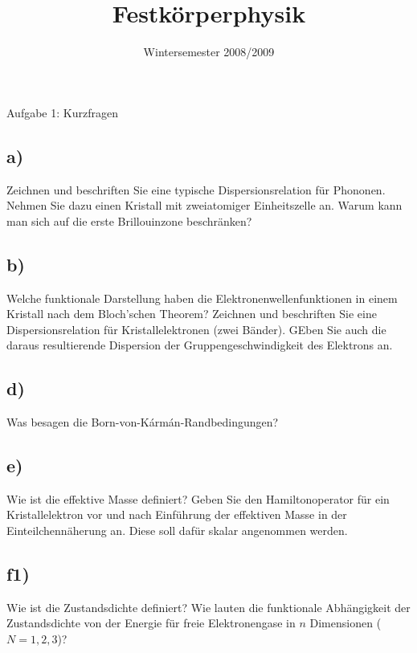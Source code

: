 

\subject{FKP}
\title{Festkörperphysik}
\date{
    Wintersemester 2008/2009
}



\maketitle
\thispagestyle{empty}
\newpage


\begin{aufgabe}{Aufgabe 1: Kurzfragen}
    \subsection{a)}
    Zeichnen und beschriften Sie eine typische Dispersionsrelation für Phononen.
    Nehmen Sie dazu einen Kristall mit zweiatomiger Einheitszelle an.
    Warum kann man sich auf die erste Brillouinzone beschränken?

    \subsection{b)}
    Welche funktionale Darstellung haben die Elektronenwellenfunktionen in einem Kristall nach dem Bloch'schen Theorem?
    Zeichnen und beschriften Sie eine Dispersionsrelation für Kristallelektronen (zwei Bänder).
    GEben Sie auch die daraus resultierende Dispersion der Gruppengeschwindigkeit des Elektrons an.


    \subsection{d)}
    Was besagen die Born-von-Kármán-Randbedingungen?

    \subsection{e)}
    Wie ist die effektive Masse definiert?
    Geben Sie den Hamiltonoperator für ein Kristallelektron vor und nach Einführung der effektiven Masse in der Einteilchennäherung an.
    Diese soll dafür skalar angenommen werden.

    \subsection{f1)} %
    Wie ist die Zustandsdichte definiert?
    Wie lauten die funktionale Abhängigkeit der Zustandsdichte von der Energie für freie Elektronengase in $n$ Dimensionen ($N = 1, 2, 3$)?


\end{aufgabe}
